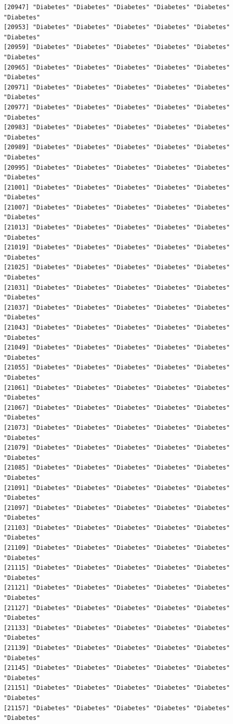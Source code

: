\documentclass[
  letterpaper,
  DIV=11,
  numbers=noendperiod]{scrartcl}
\begin{document}
\begin{verbatim}
[20947] "Diabetes" "Diabetes" "Diabetes" "Diabetes" "Diabetes" "Diabetes"
[20953] "Diabetes" "Diabetes" "Diabetes" "Diabetes" "Diabetes" "Diabetes"
[20959] "Diabetes" "Diabetes" "Diabetes" "Diabetes" "Diabetes" "Diabetes"
[20965] "Diabetes" "Diabetes" "Diabetes" "Diabetes" "Diabetes" "Diabetes"
[20971] "Diabetes" "Diabetes" "Diabetes" "Diabetes" "Diabetes" "Diabetes"
[20977] "Diabetes" "Diabetes" "Diabetes" "Diabetes" "Diabetes" "Diabetes"
[20983] "Diabetes" "Diabetes" "Diabetes" "Diabetes" "Diabetes" "Diabetes"
[20989] "Diabetes" "Diabetes" "Diabetes" "Diabetes" "Diabetes" "Diabetes"
[20995] "Diabetes" "Diabetes" "Diabetes" "Diabetes" "Diabetes" "Diabetes"
[21001] "Diabetes" "Diabetes" "Diabetes" "Diabetes" "Diabetes" "Diabetes"
[21007] "Diabetes" "Diabetes" "Diabetes" "Diabetes" "Diabetes" "Diabetes"
[21013] "Diabetes" "Diabetes" "Diabetes" "Diabetes" "Diabetes" "Diabetes"
[21019] "Diabetes" "Diabetes" "Diabetes" "Diabetes" "Diabetes" "Diabetes"
[21025] "Diabetes" "Diabetes" "Diabetes" "Diabetes" "Diabetes" "Diabetes"
[21031] "Diabetes" "Diabetes" "Diabetes" "Diabetes" "Diabetes" "Diabetes"
[21037] "Diabetes" "Diabetes" "Diabetes" "Diabetes" "Diabetes" "Diabetes"
[21043] "Diabetes" "Diabetes" "Diabetes" "Diabetes" "Diabetes" "Diabetes"
[21049] "Diabetes" "Diabetes" "Diabetes" "Diabetes" "Diabetes" "Diabetes"
[21055] "Diabetes" "Diabetes" "Diabetes" "Diabetes" "Diabetes" "Diabetes"
[21061] "Diabetes" "Diabetes" "Diabetes" "Diabetes" "Diabetes" "Diabetes"
[21067] "Diabetes" "Diabetes" "Diabetes" "Diabetes" "Diabetes" "Diabetes"
[21073] "Diabetes" "Diabetes" "Diabetes" "Diabetes" "Diabetes" "Diabetes"
[21079] "Diabetes" "Diabetes" "Diabetes" "Diabetes" "Diabetes" "Diabetes"
[21085] "Diabetes" "Diabetes" "Diabetes" "Diabetes" "Diabetes" "Diabetes"
[21091] "Diabetes" "Diabetes" "Diabetes" "Diabetes" "Diabetes" "Diabetes"
[21097] "Diabetes" "Diabetes" "Diabetes" "Diabetes" "Diabetes" "Diabetes"
[21103] "Diabetes" "Diabetes" "Diabetes" "Diabetes" "Diabetes" "Diabetes"
[21109] "Diabetes" "Diabetes" "Diabetes" "Diabetes" "Diabetes" "Diabetes"
[21115] "Diabetes" "Diabetes" "Diabetes" "Diabetes" "Diabetes" "Diabetes"
[21121] "Diabetes" "Diabetes" "Diabetes" "Diabetes" "Diabetes" "Diabetes"
[21127] "Diabetes" "Diabetes" "Diabetes" "Diabetes" "Diabetes" "Diabetes"
[21133] "Diabetes" "Diabetes" "Diabetes" "Diabetes" "Diabetes" "Diabetes"
[21139] "Diabetes" "Diabetes" "Diabetes" "Diabetes" "Diabetes" "Diabetes"
[21145] "Diabetes" "Diabetes" "Diabetes" "Diabetes" "Diabetes" "Diabetes"
[21151] "Diabetes" "Diabetes" "Diabetes" "Diabetes" "Diabetes" "Diabetes"
[21157] "Diabetes" "Diabetes" "Diabetes" "Diabetes" "Diabetes" "Diabetes"

\end{verbatim}
\end{document}
